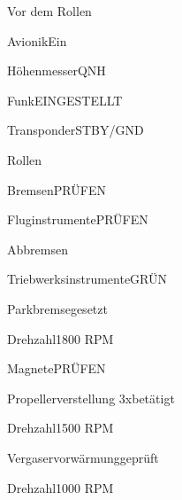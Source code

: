 \begin{memoryitem}
  \begin{checklist}{Vor dem Rollen}
    \item{Avionik}{Ein}
    \item{Höhenmesser}{QNH}
    \item{Funk}{EINGESTELLT}
    \item{Transponder}{STBY/GND}
  \end{checklist}
\end{memoryitem}

\begin{memoryitem}
  \begin{checklist}{Rollen}
    \item{Bremsen}{PRÜFEN}
    \item{Fluginstrumente}{PRÜFEN}
  \end{checklist}
\end{memoryitem}

\begin{memoryitem}
  \begin{checklist}{Abbremsen}
    \item{Triebwerksinstrumente}{GRÜN}
    \item{Parkbremse}{gesetzt}
    \item{Drehzahl}{1800 RPM}
    \item{Magnete}{PRÜFEN}
    \item{Propellerverstellung 3x}{betätigt}
    \item{Drehzahl}{1500 RPM}
    \item{Vergaservorwärmung}{geprüft}
    \item{Drehzahl}{1000 RPM}
  \end{checklist}
\end{memoryitem}

